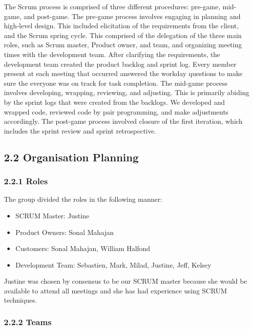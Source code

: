 \documentclass[]{article}
\begin{document}
The Scrum process is comprised of three different procedures: pre-game,
mid-game, and post-game. The pre-game process involves engaging in
planning and high-level design. This included elicitation of the
requirements from the client, and the Scrum spring cycle. This comprised
of the delegation of the three main roles, such as Scrum master, Product
owner, and team, and organizing meeting times with the development team.
After clarifying the requirements, the development team created the
product backlog and sprint log. Every member present at each meeting
that occurred answered the workday questions to make sure the everyone
was on track for task completion. The mid-game process involves
developing, wrapping, reviewing, and adjusting. This is primarily
abiding by the sprint logs that were created from the backlogs. We
developed and wrapped code, reviewed code by pair programming, and make
adjustments accordingly. The post-game process involved closure of the
first iteration, which includes the sprint review and sprint
retrospective.

\subsection{2.2 Organisation Planning}\label{organisation-planning}

\subsubsection{2.2.1 Roles}\label{roles}

The group divided the roles in the following manner:

\begin{itemize}
\itemsep1pt\parskip0pt
\item
  SCRUM Master: Justine
\item
  Product Owners: Sonal Mahajan
\item
  Customers: Sonal Mahajan, William Halfond
\item
  Development Team: Sebastien, Mark, Milad, Justine, Jeff, Kelsey
\end{itemize}

Justine was chosen by consensus to be our SCRUM master because she would
be available to attend all meetings and she has had experience using
SCRUM techniques.

\subsubsection{2.2.2 Teams}\label{teams}
\end{document}
